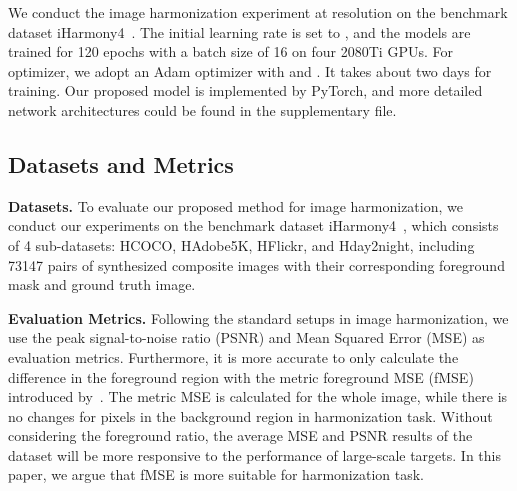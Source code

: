 \documentclass[10pt,twocolumn,letterpaper]{article}
\begin{document}
We conduct the image harmonization experiment at resolution  on the benchmark dataset iHarmony4~\cite{Cong_2020_CVPR}. The initial learning rate is set to , and the models are trained for 120 epochs with a batch size of 16 on four 2080Ti GPUs. For optimizer, we adopt an Adam optimizer with  and . It takes about two days for training. Our proposed model is implemented by PyTorch, and more detailed network architectures could be found in the supplementary file.

\subsection{Datasets and Metrics}

\noindent \textbf{Datasets.}
To evaluate our proposed method for image harmonization, we conduct our experiments on the benchmark dataset iHarmony4~\cite{Cong_2020_CVPR}, which consists of 4 sub-datasets: HCOCO, HAdobe5K, HFlickr, and Hday2night, including 73147 pairs of synthesized composite images with their corresponding foreground mask and ground truth image. 

\noindent \textbf{Evaluation Metrics.}
Following the standard setups in image harmonization, we use the peak signal-to-noise ratio (PSNR) and Mean Squared Error (MSE) as evaluation metrics. Furthermore, it is more accurate to only calculate the difference in the foreground region with the metric foreground MSE (fMSE) introduced by~\cite{Sofiiuk_2021_WACV}. The metric MSE is calculated for the whole image, while there is no changes for pixels in the background region in harmonization task. Without considering the foreground ratio, the average MSE and PSNR results of the dataset will be more responsive to the performance of large-scale targets. In this paper, we argue that fMSE is more suitable for harmonization task.
\end{document}
